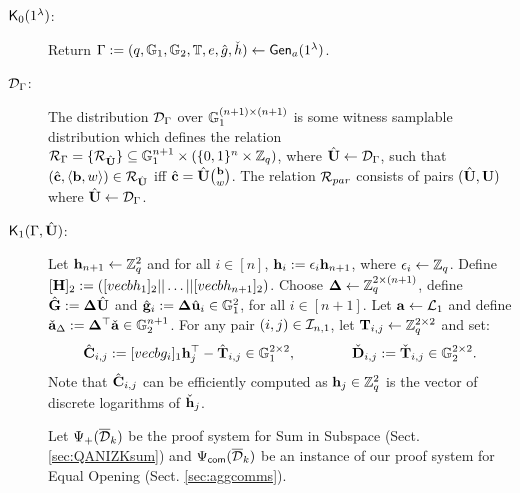 \begin{description}

\item[$\mathsf{K}_0(1^\lambda)$:]  Return $\Gamma := (q,\mathbb{G}_1,\mathbb{G}_2,\mathbb{T},e,\hat{g},\check{h}) \leftarrow \mathsf{Gen}_a(1^{\lambda})$.

\item[$\mathcal{D}_\Gamma$:] The distribution $\mathcal{D}_\Gamma$ over $\mathbb{G}_1^{(n+1) \times (n+1)}$ is some witness samplable distribution which 
defines the relation $\mathcal{R}_\Gamma = \{\mathcal{R}_{{\hat{\mathbf{{U}}}}}\} 
\subseteq \mathbb{G}_1^{n+1}\times(\{0,1\}^{n}\times\mathbb{Z}_q)$,
where ${\hat{\mathbf{{U}}}}\gets\mathcal{D}_\Gamma$,
such that $({\hat{\mathbf{c}}},\langle\mathbf{b}, w\rangle)\in\mathcal{R}_{{\hat{\mathbf{{U}}}}}$ iff
${\hat{\mathbf{c}}}={\hat{\mathbf{{U}}}}\binom{\mathbf{b}}{w}$. The relation $\mathcal{R}_{par}$ consists of pairs $({\hat{\mathbf{{U}}}},\mathbf{{U}})$ where ${\hat{\mathbf{{U}}}} \gets \mathcal{D}_{\Gamma}$.
\item[$\mathsf{K}_1(\Gamma, {\hat{\mathbf{{U}}}})$:]
Let $\mathbf{h}_{n+1}\gets \mathbb{Z}_q^2$
and for all $i \in [n]$, $\mathbf{h}_{i}:=\epsilon_{i}\mathbf{h}_{n+1}$, where
$\epsilon_{i} \leftarrow \mathbb{Z}_q$. Define
$[{\mathbf{{H}}}]_2 := ([vecb{h}_1]_2|| \ldots ||[vecb{h}_{n+1}]_2)$.
Choose 
$\mathbf{{\Delta}} \leftarrow \mathbb{Z}_q^{2 \times (n+1)}$,
define $\hat{\mathbf{{G}}} := \mathbf{{\Delta}}{\hat{\mathbf{{U}}}}$
and $\hat{\mathbf{g}}_{i}:=\mathbf{{\Delta}} \hat{\mathbf{u}}_i \in \mathbb{G}_1^2$, for all $i \in [n+1]$. 
Let $\mathbf{a} \leftarrow \mathcal{L}_{1}$ and define $\check{\mathbf{a}}_{\Delta}:=\mathbf{{\Delta}}^\top\check{\mathbf{a}} \in \mathbb{G}_2^{n+1}$. 
For any pair $(i,j) \in \mathcal{I}_{n,1}$, let 
$\mathbf{{T}}_{i,j}\gets\mathbb{Z}_q^{2\times2}$ and set:
$${\hat{\mathbf{{C}}}}_{i,j}:=[vecb{g}_i]_1 \mathbf{h}_j^{\top} - {\hat{\mathbf{{T}}}}_{i,j}  \in \mathbb{G}_1^{2 \times 2},
\qquad \qquad 
\check{\mathbf{{D}}}_{i,j}:=\check{\mathbf{{T}}}_{i,j} \in \mathbb{G}_2^{2 \times 2}.$$ 
Note that ${\hat{\mathbf{{C}}}}_{i,j}$ can be efficiently computed 
as $\mathbf{h}_j \in \mathbb{Z}_q^{2}$ is the vector of discrete logarithms of $\check{\mathbf{h}}_j$.

Let ${\Psi_{+}(\overline{\mathcal{D}}_k)}$ be the proof system for Sum in Subspace 
(Sect. \ref{sec:QANIZKsum}) and ${{\Psi_{\mathsf{com}}(\overline{\mathcal{D}}_k)}}$
be an instance of our proof system for Equal Opening (Sect. \ref{sec:aggcomms}).


\end{description}
